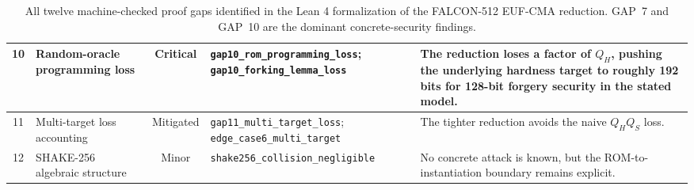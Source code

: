 \begin{table}[t]
\begin{tabular}{|c|p{2.4cm}|c|p{3.0cm}|p{5.5cm}|}
\hline
10 & Random-oracle programming loss & Critical & \texttt{gap10\_rom\_programming\_loss}; \texttt{gap10\_forking\_lemma\_loss} & The reduction loses a factor of $Q_H$, pushing the underlying hardness target to roughly 192 bits for 128-bit forgery security in the stated model. \\
\hline
11 & Multi-target loss accounting & Mitigated & \texttt{gap11\_multi\_target\_loss}; \texttt{edge\_case6\_multi\_target} & The tighter reduction avoids the naive $Q_H Q_S$ loss. \\
\hline
12 & SHAKE-256 algebraic structure & Minor & \texttt{shake256\_collision\_negligible} & No concrete attack is known, but the ROM-to-instantiation boundary remains explicit. \\
\hline
\end{tabular}
\caption{All twelve machine-checked proof gaps identified in the Lean 4 formalization of the FALCON-512 EUF-CMA reduction. GAP~7 and GAP~10 are the dominant concrete-security findings.}
\label{tab:gaps}
\end{table}
